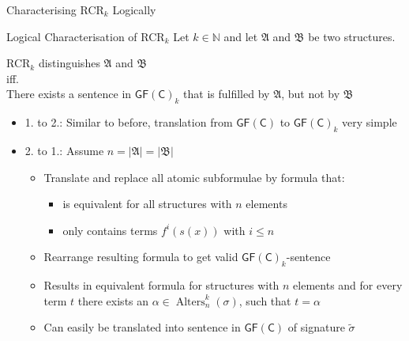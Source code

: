 \documentclass[aspectratio=169]{beamer}
\newcommand{\GFC}{\mathsf{GF}(\mathsf{C})}
\begin{document}
	\begin{frame}{Characterising RCR$_k$ Logically}
		\begin{block}{Logical Characterisation of RCR$_k$}
			Let $k\in\mathbb N$ and let $\mathfrak A$ and $\mathfrak B$ be two structures.
			\begin{center}
				RCR$_k$ distinguishes $\mathfrak A$ and $\mathfrak B$\\
				iff.\\
				There exists a sentence in $\GFC_k$ that is fulfilled by $\mathfrak A$, but not by $\mathfrak B$
			\end{center}
		\end{block}
		\begin{itemize}
			\item 1. to 2.: Similar to before, translation from $\GFC$ to $\GFC_k$ very simple
			\item 2. to 1.: Assume $n=\vert \mathfrak A \vert = \vert \mathfrak B \vert$
			\begin{itemize}
				\item Translate and replace all atomic subformulae by formula that:
				\begin{itemize}
					\item is equivalent for all structures with $n$ elements
					\item only contains terms $f^i(s(x))$ with $i\leq n$
				\end{itemize}
				\item Rearrange resulting formula to get valid $\GFC_k$-sentence
				\item Results in equivalent formula for structures with $n$ elements and for every term $t$ there exists an $\alpha\in\operatorname{Alters}^k_n(\sigma)$, such that $t=\alpha$
				\item Can easily be translated into sentence in $\GFC$ of signature $\widetilde{\sigma}$
			\end{itemize}
		\end{itemize}
	\end{frame}
	
\end{document}
